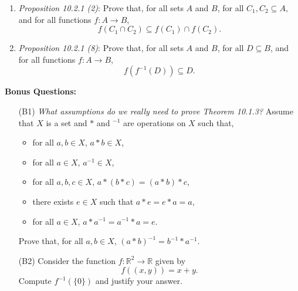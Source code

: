 \documentclass{article}
\begin{document}
\begin{enumerate}
	\item \emph{Proposition 10.2.1 (2)}: Prove that, for all sets $A$ and $B$, for all $C_1, C_2 \subseteq A$, and for all functions $f : A \rightarrow B$,
		\[
			f(C_1 \cap C_2) \subseteq f(C_1) \cap f(C_2).
		\]

	\item \emph{Proposition 10.2.1 (8)}: Prove that, for all sets $A$ and $B$, for all $D \subseteq B$, and for all functions $f : A \rightarrow B$,
		\[
			f(f^{-1}(D)) \subseteq D.
		\]
    \end{enumerate}

\newpage
\textbf{Bonus Questions:}

\begin{itemize}
	\item [(B1)] \emph{What assumptions do we really need to prove Theorem 10.1.3?}  Assume that $X$ is a set and $*$ and ${}^{-1}$ are operations on $X$ such that,
		\begin{itemize}
			\item for all $a, b \in X$, $a * b \in X$,
			\item for all $a \in X$, $a^{-1} \in X$,
			\item for all $a, b, c \in X$, $a * (b * c) = (a * b) * c$,
			\item there exists $e \in X$ such that $a * e = e * a = a$,
			\item for all $a \in X$, $a * a^{-1} = a^{-1} * a = e$.
		\end{itemize}
		Prove that, for all $a, b \in X$, $(a * b)^{-1} = b^{-1} * a^{-1}$.
	\item [(B2)] Consider the function $f : \mathbb{R}^2 \rightarrow \mathbb{R}$ given by
		\[
			f((x,y)) = x + y.
		\]
		Compute $f^{-1}( \{ 0 \} )$ and justify your answer.
\end{itemize}
\end{document}
